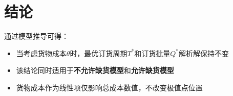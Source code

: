 \section{结论}

通过模型推导可得：
\begin{itemize}
    \item 当考虑货物成本$\theta$时，最优订货周期$T^*$和订货批量$Q^*$解析解保持不变
    \item 该结论同时适用于\textbf{不允许缺货模型}和\textbf{允许缺货模型}
    \item 货物成本作为线性项仅影响总成本数值，不改变极值点位置
\end{itemize}

